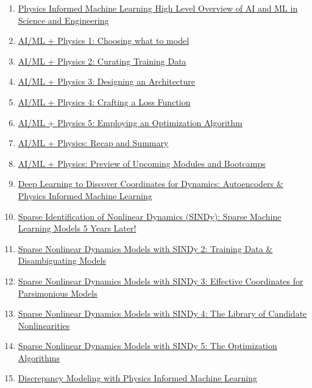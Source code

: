 \documentclass[11pt]{article}
\begin{document}
\begin{enumerate}
	\item  \href{https://mp.weixin.qq.com/s/2ftpAvrKX7JkkVftJ1EdlQ}{Physics Informed Machine Learning High Level Overview of AI and ML in Science and Engineering} %
	\item  \href{https://mp.weixin.qq.com/s/tVVU64Xr30x7RVaR8TXMJg}{AI/ML + Physics 1: Choosing what to model} %
	\item  \href{https://mp.weixin.qq.com/s/aKJ9Z-06EdYpIuu0RCtDZg}{AI/ML + Physics 2: Curating Training Data} %
	\item  \href{https://mp.weixin.qq.com/s/y8cE9yDz1Yu2hyfmTZVlHw}{AI/ML + Physics 3: Designing an Architecture} %
	\item  \href{https://mp.weixin.qq.com/s/TGtUsWgQwXzJ7sM81a-2Jw}{AI/ML + Physics 4: Crafting a Loss Function} %
	\item  \href{https://mp.weixin.qq.com/s/Mc8tmdubNkPhBQRbH5EXEQ}{AI/ML + Physics 5: Employing an Optimization Algorithm} %
	\item  \href{https://mp.weixin.qq.com/s/ABPfElt5X2cthrbOcX2_XA}{AI/ML + Physics: Recap and Summary} %
	\item  \href{https://mp.weixin.qq.com/s/m2DDlPrg785B4UNhVld7JQ}{AI/ML + Physics: Preview of Upcoming Modules and Bootcamps} %
	\item  \href{https://mp.weixin.qq.com/s/r4CKrNELwXZZTXDjc3P1SQ}{Deep Learning to Discover Coordinates for Dynamics: Autoencoders \& Physics Informed Machine Learning} %
	\item  \href{https://mp.weixin.qq.com/s/c5SBEkD1nHvfGbVt80LOBA}{Sparse Identification of Nonlinear Dynamics (SINDy): Sparse Machine Learning Models 5 Years Later!} %
	\item  \href{https://mp.weixin.qq.com/s/6FRdw-XnLmQ3u4iVnpq41A}{Sparse Nonlinear Dynamics Models with SINDy 2: Training Data \& Disambiguating Models} %
	\item  \href{https://mp.weixin.qq.com/s/wLX5Pfiea_M1G2u2NofByg}{Sparse Nonlinear Dynamics Models with SINDy 3: Effective Coordinates for Parsimonious Models} %
	\item  \href{https://mp.weixin.qq.com/s/OqG6zxINz5BpZ04FDFyG7g}{Sparse Nonlinear Dynamics Models with SINDy 4: The Library of Candidate Nonlinearities} %
	\item  \href{https://mp.weixin.qq.com/s/qObKKUD3RFQGis88ywxWPw}{Sparse Nonlinear Dynamics Models with SINDy 5: The Optimization Algorithms} %
	\item  \href{https://mp.weixin.qq.com/s/TlIw-1_yrb0ujKjP84oi6Q}{Discrepancy Modeling with Physics Informed Machine Learning} %

\end{enumerate}
\end{document}

